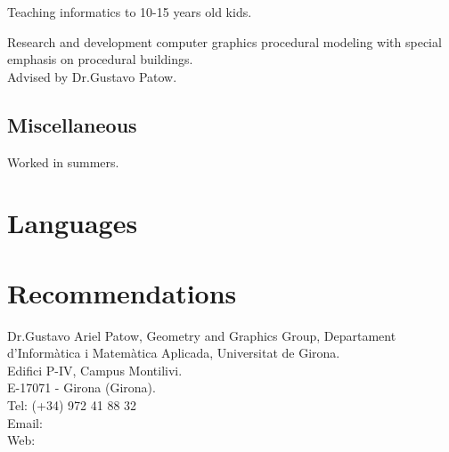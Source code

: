 
{
    Teaching informatics to 10-15 years old kids.
}


{
    Research and development computer graphics procedural modeling with special emphasis on procedural
    buildings. \\
    Advised by Dr.Gustavo Patow.
}


\subsection{Miscellaneous}

{
    Worked in summers.
}


\section{Languages}



\section{Recommendations}
    {
        Dr.Gustavo Ariel Patow, Geometry and Graphics Group, Departament d'Inform\`atica i Matem\`atica Aplicada, Universitat de Girona. \\
        Edifici P-IV, Campus Montilivi. \\
        E-17071 - Girona (Girona). \\
        Tel: (+34) 972 41 88 32 \\
        Email:  \\
        Web: 
    }

